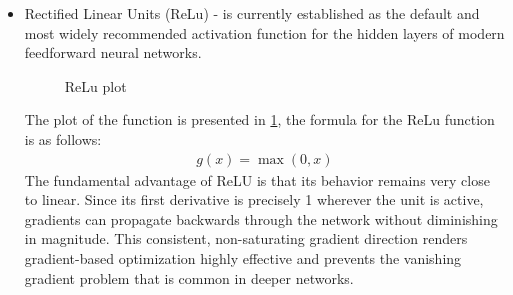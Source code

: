 \begin{itemize}
	\item Rectified Linear Units (ReLu) - is currently established as the default and most widely recommended activation function for the hidden layers of modern feedforward neural networks.

	\begin{figure} [H]
		\centering

		\caption{ReLu plot}
		\label{fig:ReLuFunction}
	\end{figure}
The plot of the function is presented in \ref{fig:ReLuFunction}, the formula for the ReLu function is as follows:
 	\begin{align}
	g(x) = \max(0, x)
\end{align}
The fundamental advantage of ReLU is that its behavior remains very close to linear. Since its first derivative is precisely 1 wherever the unit is active, gradients can propagate backwards through the network without diminishing in magnitude. This consistent, non-saturating gradient direction renders gradient-based optimization highly effective and prevents the vanishing gradient problem that is common in deeper networks.
		

\end{itemize}
